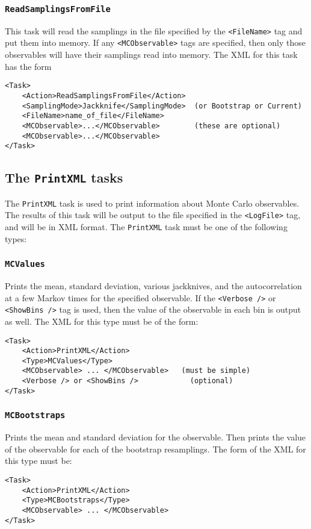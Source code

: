 \documentclass[12pt]{article}
\newcommand{\vb}{\texttt}
\begin{document}
\subsubsection{\vb{ReadSamplingsFromFile}}
This task will read the samplings in the file specified by the \vb{<FileName>} tag and
put them into memory.
If any \vb{<MCObservable>} tags are specified, then only those observables
will have their samplings read into memory.
The XML for this task has the form
\begin{verbatim}
<Task>
    <Action>ReadSamplingsFromFile</Action>
    <SamplingMode>Jackknife</SamplingMode>  (or Bootstrap or Current)
    <FileName>name_of_file</FileName>
    <MCObservable>...</MCObservable>        (these are optional)
    <MCObservable>...</MCObservable>
</Task>
\end{verbatim}

\subsection{The \vb{PrintXML} tasks}  \label{sec:print_xml}

The \vb{PrintXML} task is used to print information about Monte Carlo observables.
The results of this task will be output to the file specified in the
\vb{<LogFile>} tag, and will be in XML format.
The \vb{PrintXML} task must be one of the following types:

\subsubsection{\vb{MCValues}}
Prints the mean, standard deviation, various jackknives, and
the autocorrelation at a few Markov times for the specified observable.
If the \vb{<Verbose />} or \vb{<ShowBins />} tag is used, then the value of the observable in
each bin is output as well. The XML for this type must be of the form:
\begin{verbatim}
<Task>
    <Action>PrintXML</Action>
    <Type>MCValues</Type>
    <MCObservable> ... </MCObservable>   (must be simple)
    <Verbose /> or <ShowBins />            (optional)
</Task>
\end{verbatim}
\subsubsection{\vb{MCBootstraps}}
Prints the mean and standard deviation for the observable.
Then prints the value of the observable for each of the bootstrap resamplings.
The form of the XML for this type must be:
\begin{verbatim}
<Task>
    <Action>PrintXML</Action>
    <Type>MCBootstraps</Type>
    <MCObservable> ... </MCObservable>
</Task>
\end{verbatim}
\end{document}
